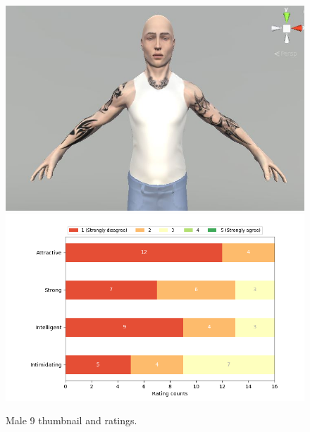 \begin{figure}[H]
  \includegraphics[width=\linewidth]{Images/Males/9.JPG}
\endminipage\hfill
{}
  \includegraphics[width=\linewidth]{Survey/MRatings/avatar_m9.png}
\endminipage\hfill
\caption{Male 9 thumbnail and ratings.}
\end{figure}


